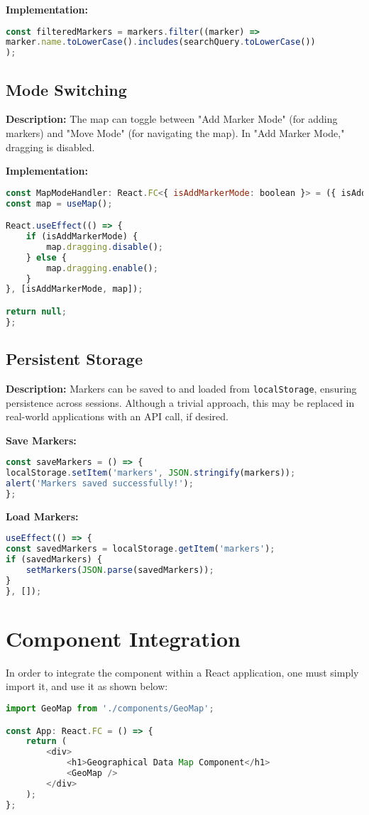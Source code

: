 \documentclass[11pt]{article}
\begin{document}
    \textbf{Implementation:}
    \begin{lstlisting}[language=javascript]
const filteredMarkers = markers.filter((marker) =>
marker.name.toLowerCase().includes(searchQuery.toLowerCase())
);
    \end{lstlisting}

    \subsection{Mode Switching}
    \textbf{Description:} The map can toggle between "Add Marker Mode" (for adding markers) and "Move Mode" (for navigating the map). In "Add Marker Mode," dragging is disabled.

    \textbf{Implementation:}
    \begin{lstlisting}[language=javascript]
const MapModeHandler: React.FC<{ isAddMarkerMode: boolean }> = ({ isAddMarkerMode }) => {
const map = useMap();

React.useEffect(() => {
    if (isAddMarkerMode) {
        map.dragging.disable();
    } else {
        map.dragging.enable();
    }
}, [isAddMarkerMode, map]);

return null;
};
    \end{lstlisting}

    \subsection{Persistent Storage}
    \textbf{Description:} Markers can be saved to and loaded from \texttt{localStorage}, ensuring persistence across sessions. Although a trivial approach, this may be replaced in real-world applications with an API call, if desired.

    \textbf{Save Markers:}
    \begin{lstlisting}[language=javascript]
const saveMarkers = () => {
localStorage.setItem('markers', JSON.stringify(markers));
alert('Markers saved successfully!');
};
    \end{lstlisting}

    \textbf{Load Markers:}
    \begin{lstlisting}[language=javascript]
useEffect(() => {
const savedMarkers = localStorage.getItem('markers');
if (savedMarkers) {
    setMarkers(JSON.parse(savedMarkers));
}
}, []);
    \end{lstlisting}

    \section{Component Integration}

    In order to integrate the component within a React application, one must simply import it, and use it as shown below:

    \begin{lstlisting}[language=javascript]
import GeoMap from './components/GeoMap';

const App: React.FC = () => {
    return (
        <div>
            <h1>Geographical Data Map Component</h1>
            <GeoMap />
        </div>
    );
};
    \end{lstlisting}
\end{document}
